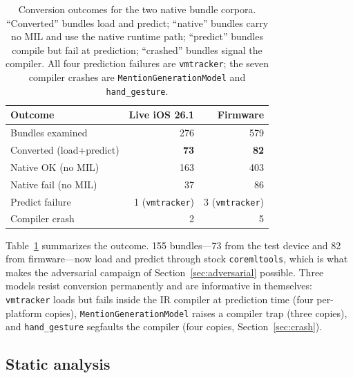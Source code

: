 \documentclass[letterpaper,twocolumn,10pt]{article}
\newcommand{\coremltools}{\texttt{coremltools}\xspace}
\begin{document}
\begin{table}[t]
\centering
\caption{Conversion outcomes for the two native bundle corpora.
``Converted'' bundles load and predict; ``native'' bundles carry no MIL and
use the native runtime path; ``predict'' bundles compile but fail at
prediction; ``crashed'' bundles signal the compiler.
All four prediction failures are \texttt{vmtracker}; the seven compiler
crashes are \texttt{MentionGenerationModel} and \texttt{hand\_gesture}.}
\label{tab:conversion}
\scriptsize
\setlength{\tabcolsep}{4pt}
\begin{tabular}{@{}lrr@{}}
\toprule
\textbf{Outcome} & \textbf{Live iOS 26.1} & \textbf{Firmware} \\
\midrule
Bundles examined      & 276 & 579 \\
Converted (load+predict) & \textbf{73} & \textbf{82} \\
Native OK (no MIL)    & 163 & 403 \\
Native fail (no MIL)  & 37  & 86 \\
Predict failure       & 1 (\texttt{vmtracker}) & 3 (\texttt{vmtracker}) \\
Compiler crash        & 2 & 5 \\
\bottomrule
\end{tabular}
\end{table}

Table~\ref{tab:conversion} summarizes the outcome.
155 bundles---73 from the test device and 82 from firmware---now load and
predict through stock \coremltools{}, which is what makes the adversarial
campaign of Section~\ref{sec:adversarial} possible.
Three models resist conversion permanently and are informative in
themselves: \texttt{vmtracker} loads but fails inside the IR compiler at
prediction time (four per-platform copies), \texttt{MentionGenerationModel}
raises a compiler trap (three copies), and \texttt{hand\_gesture} segfaults
the compiler (four copies, Section~\ref{sec:crash}).

\subsection{Static analysis}
\label{sec:static_method}
\end{document}
